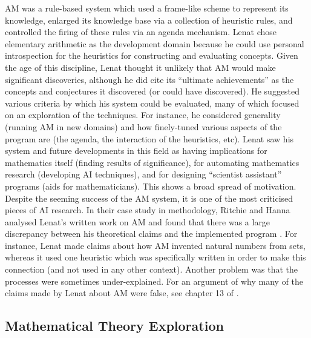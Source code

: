 AM was a rule-based system which used a frame-like scheme to represent
its knowledge, enlarged its knowledge base via a collection of
heuristic rules, and controlled the firing of these rules via an
agenda mechanism. Lenat chose elementary arithmetic as the development
domain because he could use personal introspection for the heuristics
for constructing and evaluating concepts. Given the age of this
discipline, Lenat thought it unlikely that AM would make significant
discoveries, although he did cite its ``ultimate achievements'' as the
concepts and conjectures it discovered (or could have discovered). He
suggested various criteria by which his system could be evaluated,
many of which focused on an exploration of the techniques. For
instance, he considered generality (running AM in new domains) and how
finely-tuned various aspects of the program are (the agenda, the
interaction of the heuristics, etc). %
Lenat saw his system and future developments in this field as having
implications for mathematics itself (finding results of significance),
for automating mathematics research (developing AI techniques), and
for designing ``scientist assistant'' programs (aids for
mathematicians). This shows a broad spread of motivation. Despite the
seeming success of the AM system, it is one of the most criticised
pieces of AI research. In their case study in methodology, Ritchie and
Hanna analysed Lenat's written work on AM and found that there was a
large discrepancy between his theoretical claims and the implemented
program \cite{partridge}. For instance, Lenat made claims about how AM
invented natural numbers from sets, whereas it used one heuristic
which was specifically written in order to make this connection (and
not used in any other context). Another problem was that the processes
were sometimes under-explained. For an argument of why many of the
claims made by Lenat about AM were false, see chapter 13 of
\cite{colton:book}.

\subsection{Mathematical Theory Exploration}

